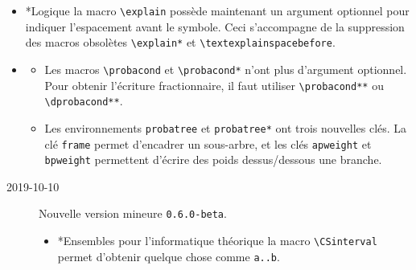 \documentclass[12pt,a4paper]{book}
\makeatletter
\newcommand\env[1]{\texttt{#1}}
\newcommand\macro[1]{\env{\textbackslash{}#1}}
\theoremstyle{definition}
\newcommand\topic{\@ifstar{\@topic@star}{\@topic@no@star}}
\newcommand\@topic@no@star[1]{%
	\textbf{\textsc{#1}.}%
}
\newcommand\@topic@star[1]{%
	\textbf{\textsc{#1} :}%
}
\makeatother
\begin{document}
{{\begin{description}
\begin{itemize}[itemsep=.5em]
\begin{itemize}[itemsep=.5em]
            \item \macro{geneset} est devenu \macro{setgene}.
    
            \item \macro{probaset} est devenu \macro{setproba}.
    
            \item \macro{specialset} est devenu \macro{setspecial}.
        \end{itemize}
    
    
    
    
        \item \topic*{Logique}
    	      la macro \macro{explain} possède maintenant un argument optionnel pour indiquer l'espacement avant le symbole.
              Ceci s'accompagne de la suppression des macros obsolètes \macro{explain*} et \macro{textexplainspacebefore}.
    
    
    
    
        \item \topic{Probabilité}
        \begin{itemize}[itemsep=.5em]
            \item Les macros \macro{probacond} et \macro{probacond*} n'ont plus d'argument optionnel. Pour obtenir l'écriture fractionnaire, il faut utiliser \macro{probacond**} ou \macro{dprobacond**}.
    
            \item Les environnements \verb+probatree+ et \verb+probatree*+ ont trois nouvelles clés.
                  La clé \verb+frame+ permet d'encadrer un sous-arbre, et les clés \verb+apweight+ et \verb+bpweight+ permettent d'écrire des poids dessus/dessous une branche.
        \end{itemize}
    \end{itemize}
\end{description}

\begin{description}    \item[2019-10-10] Nouvelle version mineure \verb+0.6.0-beta+.
    
    \begin{itemize}[itemsep=.5em]
        \item \topic*{Ensembles}
        	  pour l'informatique théorique la macro \macro{CSinterval} permet d'obtenir quelque chose comme \verb+a..b+.
    
    
    

\end{itemize}
\end{description}}}
\end{document}
